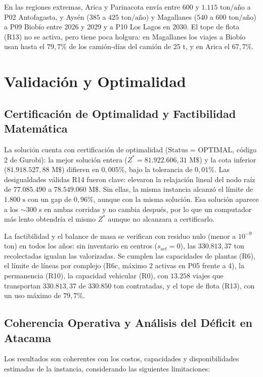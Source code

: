 \documentclass[letterpaper]{article}
\begin{document}
En las regiones extremas, Arica y Parinacota envía entre $600$ y $1.115\text{ ton/año}$ a P02 Antofagasta, y Aysén ($385$ a $425\text{ ton/año}$) y Magallanes ($540$ a $600\text{ ton/año}$) a P09 Biobío entre 2026 y 2029 y a P10 Los Lagos en 2030. El tope de flota (R13) no se activa, pero tiene poca holgura: en Magallanes los viajes a Biobío usan hasta el $79,7\%$ de los camión-días del camión de 25 t, y en Arica el $67,7\%$.

\section{Validación y Optimalidad}

\subsection{Certificación de Optimalidad y Factibilidad Matemática}

La solución cuenta con certificación de optimalidad ($\text{Status = OPTIMAL}$, código 2 de Gurobi): la mejor solución entera ($Z^{*} = 81.922.606,31\text{ M\$}$) y la cota inferior ($81.918.527,88\text{ M\$}$) difieren en $0,005\%$, bajo la tolerancia de $0,01\%$. Las desigualdades válidas R14 fueron clave: elevaron la relajación lineal del nodo raíz de $77.085.490$ a $78.549.060\text{ M\$}$. Sin ellas, la misma instancia alcanzó el límite de $1.800\text{ s}$ con un gap de $0,96\%$, aunque con la misma solución. Esa solución aparece a los $\sim$300 s en ambas corridas y no cambia después, por lo que un computador más lento obtendría el mismo $Z^{*}$ aunque no alcanzara a certificarlo.

La factibilidad y el balance de masa se verifican con residuo nulo (menor a $10^{-9}$ ton) en todos los años: sin inventario en centros ($s_{oct}=0$), las $330.813,37\text{ ton}$ recolectadas igualan las valorizadas. Se cumplen las capacidades de plantas (R6), el límite de líneas por complejo (R6c, máximo 2 activas en P05 frente a 4), la permanencia (R10), la capacidad vehicular (R0), con $13.258$ viajes que transportan $330.813,37$ de $330.850\text{ ton}$ contratadas, y el tope de flota (R13), con un uso máximo de $79,7\%$.

\subsection{Coherencia Operativa y Análisis del Déficit en Atacama}

Los resultados son coherentes con los costos, capacidades y disponibilidades estimadas de la instancia, considerando las siguientes limitaciones:
\end{document}
